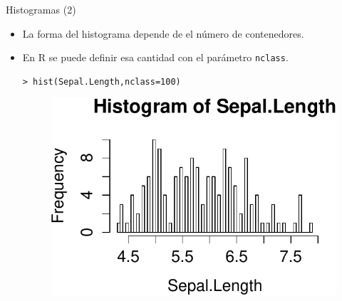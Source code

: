 \documentclass[handout]{beamer}
\begin{document}
\begin{frame}[fragile]{Histogramas (2) }
\scriptsize{
\begin{itemize}
 \item La forma del histograma depende de el número de contenedores.
 \item En R se puede definir esa cantidad con el parámetro \verb+nclass+.
 \begin{verbatim}
> hist(Sepal.Length,nclass=100)
 \end{verbatim}
 \begin{figure}[h!]
	\centering
	\includegraphics[scale=0.6]{imagenes/hist2.pdf}
	
	
\end{figure} 

\end{itemize}

}
\end{frame}
\end{document}
